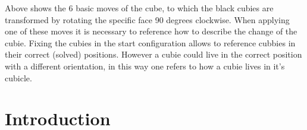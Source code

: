 \documentclass{article}
\begin{document}
\begin{figure}[h]
{
}
\end{figure}
\vspace{20pt}
\newline Above shows the 6 basic moves of the cube, to which the black cubies are transformed by rotating the specific face 90 degrees clockwise.  When applying one of these moves it is necessary to reference how to describe the change of the cubie. Fixing the cubies in the start configuration allows to reference cubbies in their correct (solved) positions. However a cubie could live in the correct position with a different orientation, in this way one refers to how a cubie lives in it's cubicle.

\section{Introduction}
\end{document}

